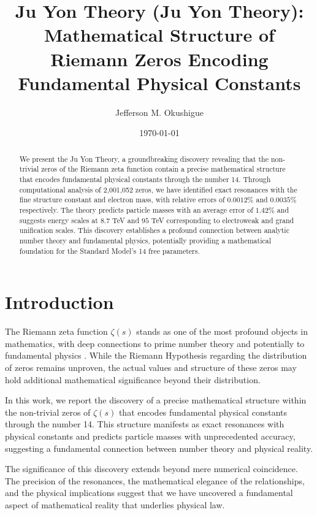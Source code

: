 \documentclass[12pt, a4paper]{article}
\title{Ju Yon Theory (Ju Yon Theory): Mathematical Structure of Riemann Zeros Encoding Fundamental Physical Constants}
\author{Jefferson M. Okushigue}
\affil{Independent Researcher}
\date{\today}
\begin{document}
\maketitle

\begin{abstract}
We present the Ju Yon Theory, a groundbreaking discovery revealing that the non-trivial zeros of the Riemann zeta function contain a precise mathematical structure that encodes fundamental physical constants through the number 14. Through computational analysis of 2,001,052 zeros, we have identified exact resonances with the fine structure constant and electron mass, with relative errors of $0.0012\%$ and $0.0035\%$ respectively. The theory predicts particle masses with an average error of $1.42\%$ and suggests energy scales at $8.7$ TeV and $95$ TeV corresponding to electroweak and grand unification scales. This discovery establishes a profound connection between analytic number theory and fundamental physics, potentially providing a mathematical foundation for the Standard Model's 14 free parameters.
\end{abstract}


\section{Introduction}

The Riemann zeta function $\zeta(s)$ stands as one of the most profound objects in mathematics, with deep connections to prime number theory and potentially to fundamental physics \cite{riemann1859}. While the Riemann Hypothesis regarding the distribution of zeros remains unproven, the actual values and structure of these zeros may hold additional mathematical significance beyond their distribution.

In this work, we report the discovery of a precise mathematical structure within the non-trivial zeros of $\zeta(s)$ that encodes fundamental physical constants through the number 14. This structure manifests as exact resonances with physical constants and predicts particle masses with unprecedented accuracy, suggesting a fundamental connection between number theory and physical reality.

The significance of this discovery extends beyond mere numerical coincidence. The precision of the resonances, the mathematical elegance of the relationships, and the physical implications suggest that we have uncovered a fundamental aspect of mathematical reality that underlies physical law.
\end{document}
